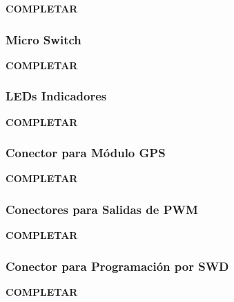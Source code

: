 \textbf{{\color{red} COMPLETAR}}

\subsubsection{Micro Switch}

\textbf{{\color{red} COMPLETAR}}

\subsubsection{LEDs Indicadores}

\textbf{{\color{red} COMPLETAR}}

\subsubsection{Conector para Módulo GPS}

\textbf{{\color{red} COMPLETAR}}

\subsubsection{Conectores para Salidas de PWM}

\textbf{{\color{red} COMPLETAR}}

\subsubsection{Conector para Programación por SWD}

\textbf{{\color{red} COMPLETAR}}

